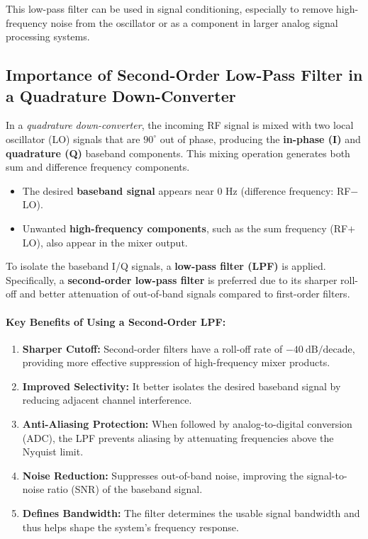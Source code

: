 This low-pass filter can be used in signal conditioning, especially to remove high-frequency noise from the oscillator or as a component in larger analog signal processing systems.


\subsection*{Importance of Second-Order Low-Pass Filter in a Quadrature Down-Converter}

In a \textit{quadrature down-converter}, the incoming RF signal is mixed with two local oscillator (LO) signals that are $90^\circ$ out of phase, producing the \textbf{in-phase (I)} and \textbf{quadrature (Q)} baseband components. This mixing operation generates both sum and difference frequency components.

\begin{itemize}
    \item The desired \textbf{baseband signal} appears near 0 Hz (difference frequency: RF$-$LO).
    \item Unwanted \textbf{high-frequency components}, such as the sum frequency (RF$+$LO), also appear in the mixer output.
\end{itemize}

To isolate the baseband I/Q signals, a \textbf{low-pass filter (LPF)} is applied. Specifically, a \textbf{second-order low-pass filter} is preferred due to its sharper roll-off and better attenuation of out-of-band signals compared to first-order filters.

\paragraph{Key Benefits of Using a Second-Order LPF:}
\begin{enumerate}
    \item \textbf{Sharper Cutoff:} Second-order filters have a roll-off rate of $-40~\text{dB/decade}$, providing more effective suppression of high-frequency mixer products.
    
    \item \textbf{Improved Selectivity:} It better isolates the desired baseband signal by reducing adjacent channel interference.
    
    \item \textbf{Anti-Aliasing Protection:} When followed by analog-to-digital conversion (ADC), the LPF prevents aliasing by attenuating frequencies above the Nyquist limit.
    
    \item \textbf{Noise Reduction:} Suppresses out-of-band noise, improving the signal-to-noise ratio (SNR) of the baseband signal.
    
    \item \textbf{Defines Bandwidth:} The filter determines the usable signal bandwidth and thus helps shape the system's frequency response.
\end{enumerate}
